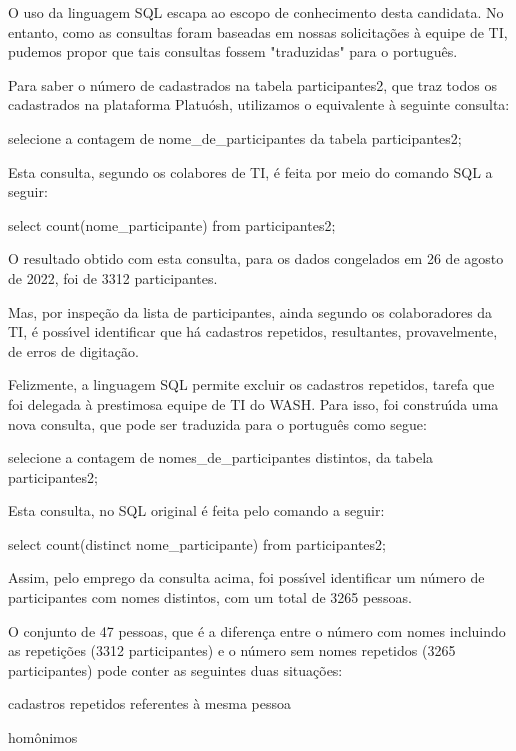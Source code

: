 \documentclass[
12pt,		%
openright,	%
twoside,  %
a4paper,			%
chapter=TITLE,		%
english,			%
french,				%
spanish,			%
brazil				%
]{USPSC-classe/USPSC}
\begin{document}
O uso da linguagem SQL escapa ao escopo de conhecimento desta candidata. No entanto, como as consultas foram baseadas em nossas solicita\c{c}\~oes \`a equipe de TI, pudemos propor que tais consultas fossem "traduzidas" para o portugu\^es.


Para saber o n\'umero de cadastrados na tabela participantes2, que traz todos os cadastrados na plataforma Platu\'osh, utilizamos o equivalente \`a seguinte consulta:


selecione a contagem de nome\_de\_participantes da tabela participantes2;



Esta consulta, segundo os colabores de TI, \'e feita por meio do comando SQL a seguir:


select count(nome\_participante) from participantes2;



O resultado obtido com esta consulta, para os dados congelados em 26 de agosto de 2022, foi de 3312 participantes.


Mas, por inspe\c{c}\~ao da lista de participantes, ainda segundo os colaboradores da TI, \'e poss\'{\i}vel identificar que h\'a cadastros repetidos, resultantes, provavelmente, de erros de digita\c{c}\~ao.


Felizmente, a linguagem SQL permite excluir os cadastros repetidos, tarefa que foi delegada \`a prestimosa equipe de TI do WASH. Para isso, foi constru\'{\i}da uma nova consulta, que pode ser traduzida para o portugu\^es como segue:


selecione a contagem de nomes\_de\_participantes distintos, da tabela participantes2;



Esta consulta, no SQL original \'e feita pelo comando a seguir:


select count(distinct nome\_participante) from participantes2;



Assim, pelo emprego da consulta acima, foi poss\'{\i}vel identificar um n\'umero de participantes com nomes distintos, com um total de 3265 pessoas.


O conjunto de 47 pessoas, que \'e a diferen\c{c}a entre o n\'umero com nomes incluindo as repeti\c{c}\~oes (3312 participantes) e o n\'umero sem nomes repetidos (3265 participantes) pode conter as seguintes duas situa\c{c}\~oes:



\begin{alineas}
\item cadastros repetidos referentes \`a mesma pessoa
\item hom\^onimos
\end{alineas}
\end{document}
